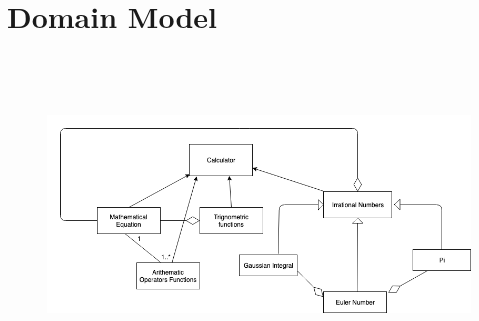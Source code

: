 \documentclass[12pt]{report}
\begin{document}
\vspace{\baselineskip}

\vspace{\baselineskip}

\vspace{\baselineskip}

\vspace{\baselineskip}

\vspace{\baselineskip}

\vspace{\baselineskip}
\section*{Domain Model}

\vspace{\baselineskip}



\begin{figure}[H]
	\begin{Center}
		\includegraphics[width=7.1in,height=3.31in]{./image5.png}
	\end{Center}
\end{figure}



\par


\vspace{\baselineskip}

\vspace{\baselineskip}

\vspace{\baselineskip}
\end{document}
